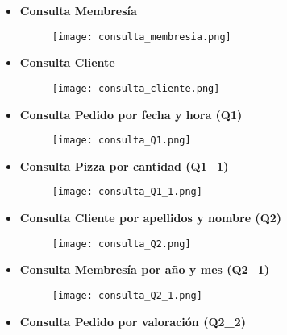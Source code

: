 \documentclass[a4paper]{article}
\begin{document}
\begin{itemize}
    \item \textbf{\large{Consulta Membresía}}

    \begin{figure}[H]
        \centering
        \texttt{[image: consulta\_membresia.png]}
        \label{fig:consulta_membresia}
    \end{figure}

    \item \textbf{\large{Consulta Cliente}}

    \begin{figure}[H]
        \centering
        \texttt{[image: consulta\_cliente.png]}
        \label{fig:consulta_cliente}
    \end{figure}

\newpage

    \item \textbf{\large{Consulta Pedido por fecha y hora (Q1)}}

    \begin{figure}[H]
        \centering
        \texttt{[image: consulta\_Q1.png]}
        \label{fig:consulta_Q1}
    \end{figure}

    \item \textbf{\large{Consulta Pizza por cantidad (Q1\_1)}}

    \begin{figure}[H]
        \centering
        \texttt{[image: consulta\_Q1\_1.png]}
        \label{fig:consulta_Q1_1}
    \end{figure}

    \item \textbf{\large{Consulta Cliente por apellidos y nombre (Q2)}}

    \begin{figure}[H]
        \centering
        \texttt{[image: consulta\_Q2.png]}
        \label{fig:consulta_Q2}
    \end{figure}

\newpage

    \item \textbf{\large{Consulta Membresía por año y mes (Q2\_1)}}

    \begin{figure}[H]
        \centering
        \texttt{[image: consulta\_Q2\_1.png]}
        \label{fig:consulta_Q2_1}
    \end{figure}

    \item \textbf{\large{Consulta Pedido por valoración (Q2\_2)}}


\end{itemize}
\end{document}
